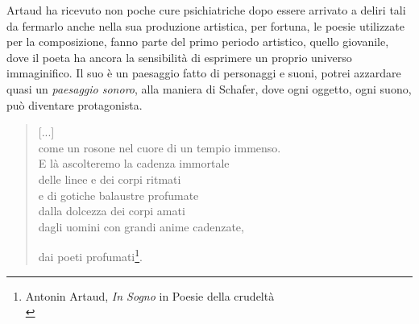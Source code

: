 Artaud ha ricevuto non poche cure psichiatriche dopo essere arrivato a deliri tali da fermarlo anche nella sua produzione artistica, per fortuna, le poesie utilizzate per la composizione, fanno parte del primo periodo artistico, quello giovanile, dove il poeta ha ancora la sensibilità di esprimere un proprio universo immaginifico. Il suo è un paesaggio fatto di personaggi e suoni, potrei azzardare quasi un \textit{paesaggio sonoro}, alla maniera di Schafer, dove ogni oggetto, ogni suono, può diventare protagonista.
\begin{quotation}
[...] \\
come un rosone nel cuore di un tempio immenso. \\
E là ascolteremo la cadenza immortale \\
delle linee e dei corpi ritmati \\
e di gotiche balaustre profumate \\
dalla dolcezza dei corpi amati \\
dagli uomini con grandi anime cadenzate, \\
\centerline{dai poeti profumati\footnote{Antonin Artaud, \textit{In Sogno} in Poesie della crudeltà \\}.}
\end{quotation}

